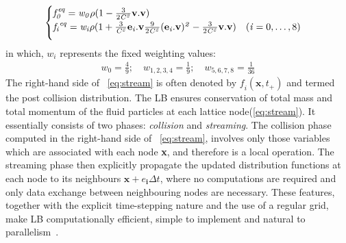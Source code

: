 \begin{align}
\begin{cases}
\mathit{f}_{\mathit{0}}^{\mathit{eq}}=\mathit{w}_{\mathit{0}} \rho (1 - \frac{3}{2\mathit{C}^{\mathit{2}}}\mathbf{v}.\mathbf{v}) \\ 
\vspace*{2mm}
\mathit{f_i}^{\mathit{eq}}=\mathit{w_i} \rho (1 + \frac{3}{\mathit{C}^{\mathit{2}}}\mathbf{e}_{\mathit{i}}.\mathbf{v} \frac{9}{2\mathit{C}^{\mathit{2}}} (\mathbf{e}_{\mathit{i}}.\mathbf{v})^{\mathit{2}}-\frac{3}{2 \mathit{C}^{\mathit{2}}}\mathbf{v}.\mathbf{v}) \quad (\mathit{i}=0,\dots,8)
\end{cases}
\end{align}
in which, $\mathit{w_i}$ represents the fixed weighting values:
\begin{align}
\mathit{w}_{\mathit{0}} = \frac{4}{9}; \quad \mathit{w}_{\mathit{1,2,3,4}}= \frac{1}{9}; \quad \mathit{w}_{\mathit{5,6,7,8}}= \frac{1}{36}
\end{align}
The right-hand side of ~\cref{eq:stream} is often denoted by $\mathit{f_i}(\mathbf{x}, \mathit{t}_{+})$ and termed the post collision distribution. The LB ensures conservation of total mass and total momentum of the fluid particles at each lattice node(\cref{eq:stream}). It essentially consists of two phases: \textit{collision} and \textit{streaming}. The collision phase computed in the right-hand side of ~\cref{eq:stream}, involves only those variables which are associated with each node \textbf{x}, and therefore is a local operation. The streaming phase then explicitly propagate the updated distribution functions at each node to its neighbours $\mathbf{x}+\mathbf{\mathit{e}_i} \Delta t$, where no computations are required and only data exchange between neighbouring nodes are necessary. These features, together with the explicit time-stepping nature and the use of a regular grid, make LB computationally efficient, simple to implement and natural to parallelism~\citep{Han2007}. 

